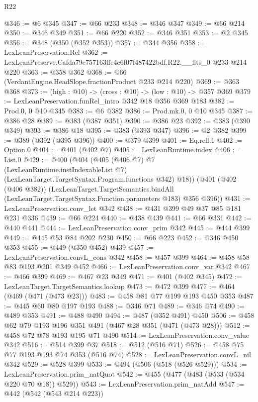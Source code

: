 \begin{lexlean}{R22}
\begin{coremodule}
@346 := @6 @345
@347 := @66 @233
@348 := @346 @347
@349 := @66 @214
@350 := @346 @349
@351 := @66 @220
@352 := @346 @351
@353 := @2 @345
@356 := @348 (@350 (@352 @353))
@357 := @344 @356
@358 := LexLeanPreservation.Rel
@362 := LexLeanPreserve.Cafda79c757163ffe4c6f07f487422bdf.R22.__fits_0 @233 @214 @220
@363 := @358 @362
@368 := @66 (VerdantEngine.HeadSlope.fractionProduct @233 @214 @220)
@369 := @363 @368
@373 := (high : @10) -> (cross : @10) -> (low : @10) -> @357 @369
@379 := LexLeanPreservation.funRel_intro @342 @18 @356 @369 @183
@382 := Prod.{0, 0} @10 @345
@383 := @6 @382
@386 := Prod.mk.{0, 0} @10 @345
@387 := @386 @28
@389 := @383 (@387 @351)
@390 := @386 @23
@392 := @383 (@390 @349)
@393 := @386 @18
@395 := @383 (@393 @347)
@396 := @2 @382
@399 := @389 (@392 (@395 @396))
@400 := @379 @399
@401 := Eq.refl.{1}
@402 := Option.{0}
@404 := @401 (@402 @7)
@405 := LexLeanRuntime.index
@406 := List.{0}
@429 := @400
    (@404
      (@405
        (@406 @7)
        @7
        (LexLeanRuntime.instIndexableList @7)
        (LexLeanTarget.TargetSyntax.Program.functions @342)
        @18))
    (@401
      (@402 (@406 @382))
      (LexLeanTarget.TargetSemantics.bindAll
        (LexLeanTarget.TargetSyntax.Function.parameters @183)
        @356
        @396))
@431 := LexLeanPreservation.conv_let @342
@438 := @431 @399 @49 @37 @85 @181 @231 @336
@439 := @66 @224
@440 := @438 @439
@441 := @66 @331
@442 := @440 @441
@444 := LexLeanPreservation.conv_prim @342
@445 := @444 @399
@449 := @445 @53 @84 @202 @230
@450 := @66 @223
@452 := @346 @450 @353
@455 := @449 (@350 @452) @439
@457 := LexLeanPreservation.convL_cons @342
@458 := @457 @399
@464 := @458 @58 @83 @193 @201 @349 @452
@466 := LexLeanPreservation.conv_var @342
@467 := @466 @399
@469 := @467 @23 @349
@471 := @401 (@402 @345)
@472 := LexLeanTarget.TargetSemantics.lookup
@473 := @472 @399
@477 := @464 (@469 (@471 (@473 @23)))
@483 := @458 @81 @77 @199 @193 @450 @353
@487 := @445 @60 @80 @197 @193
@488 := @346 @71
@489 := @346 @74
@490 := @489 @353
@491 := @488 @490
@494 := @487 (@352 @491) @450
@506 := @458 @62 @79 @193 @196 @351 @491 (@467 @28 @351 (@471 (@473 @28)))
@512 := @458 @72 @78 @193 @195 @71 @490
@514 := LexLeanPreservation.conv_value @342
@516 := @514 @399 @37
@518 := @512 (@516 @71)
@526 := @458 @75 @77 @193 @193 @74 @353 (@516 @74)
@528 := LexLeanPreservation.convL_nil @342
@529 := @528 @399
@533 := @494 (@506 (@518 (@526 @529)))
@534 := LexLeanPreservation.prim_natQuot
@542 := @455 (@477 (@483 (@533 (@534 @220 @70 @18)) @529))
@543 := LexLeanPreservation.prim_natAdd
@547 := @442 (@542 (@543 @214 @223))

\end{coremodule}
\end{lexlean}
